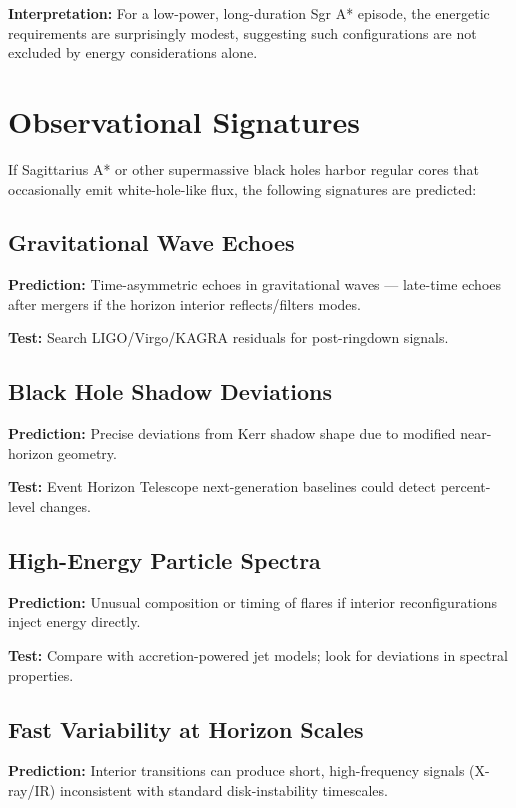 \documentclass[11pt,a4paper]{article}
\begin{document}
\textbf{Interpretation:} For a low-power, long-duration Sgr A* episode, the energetic requirements are surprisingly modest, suggesting such configurations are not excluded by energy considerations alone.

\section{Observational Signatures}

If Sagittarius A* or other supermassive black holes harbor regular cores that occasionally emit white-hole-like flux, the following signatures are predicted:

\subsection{Gravitational Wave Echoes}

\textbf{Prediction:} Time-asymmetric echoes in gravitational waves --- late-time echoes after mergers if the horizon interior reflects/filters modes.

\textbf{Test:} Search LIGO/Virgo/KAGRA residuals for post-ringdown signals.

\subsection{Black Hole Shadow Deviations}

\textbf{Prediction:} Precise deviations from Kerr shadow shape due to modified near-horizon geometry.

\textbf{Test:} Event Horizon Telescope next-generation baselines could detect percent-level changes.

\subsection{High-Energy Particle Spectra}

\textbf{Prediction:} Unusual composition or timing of flares if interior reconfigurations inject energy directly.

\textbf{Test:} Compare with accretion-powered jet models; look for deviations in spectral properties.

\subsection{Fast Variability at Horizon Scales}

\textbf{Prediction:} Interior transitions can produce short, high-frequency signals (X-ray/IR) inconsistent with standard disk-instability timescales.
\end{document}
